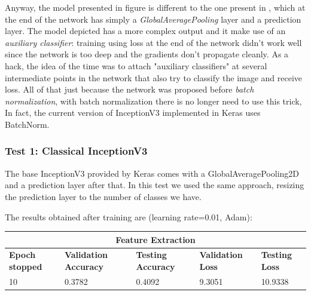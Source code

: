 Anyway, the model presented in figure is different to the one present in , which at the end of the network has simply a \textit{GlobalAveragePooling} layer and a prediction layer. The model depicted has a more complex output and it make use of an \textit{auxiliary classifier}: training using loss at the end of the network didn't work well since the network is too deep and the gradients don't propagate cleanly. As a hack, the idea of the time was to attach "auxiliary classifiers" at several intermediate points in the network that also try to classify the image and receive loss. All of that just because the network was proposed before \textit{batch normalization}, with batch normalization there is no longer need to use this trick, In fact, the current version of InceptionV3 implemented in Keras uses BatchNorm.



\subsubsection{Test 1: Classical InceptionV3}
The base InceptionV3 provided by Keras comes with a GlobalAveragePooling2D and a prediction layer after that. In this test we used the same approach, resizing the prediction layer to the number of classes we have.

\noindent The results obtained after training are (learning rate=0.01, Adam):
\medskip

\begin{tabular}{ |p{2cm}|p{2cm}|p{2cm}|p{2cm}|p{2cm}|  }
\hline
\multicolumn{5}{|c|}{Feature Extraction} \\
\hline
\textbf{Epoch stopped} & \textbf{Validation Accuracy} & \textbf{Testing Accuracy} & \textbf{Validation Loss} & \textbf{Testing Loss} \\
\hline
10 & 0.3782 & 0.4092 & 9.3051 & 10.9338\\
\hline
\end{tabular}

